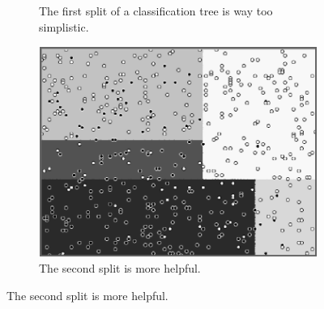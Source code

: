 \begin{figure}[!htb]
\begin{center}
\begin{subfigure}[t]{0.25\textwidth}
\caption{\label{fig:lmt2} The first split of a classification tree is way too simplistic.}
\end{subfigure}
\hspace*{1cm}
\begin{subfigure}[t]{0.25\textwidth}
\centering
\includegraphics[width=\textwidth]{figures/chapitre6/lmt_tree_2.png}
\caption{\label{fig:lmt3}  The second split is more helpful.}
\end{subfigure}
\end{center}


\end{figure}
